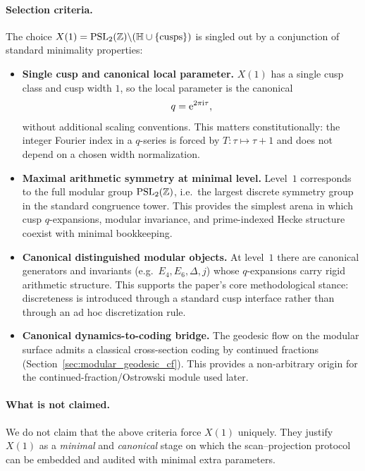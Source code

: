 \paragraph{Selection criteria.}
The choice $X(1)=\mathrm{PSL}_2(\mathbb{Z})\backslash(\mathbb{H}\cup\{\text{cusps}\})$ is singled out by a conjunction of standard minimality properties:
\begin{itemize}
  \item \textbf{Single cusp and canonical local parameter.}
  $X(1)$ has a single cusp class and cusp width $1$, so the local parameter is the canonical
  \begin{equation}
  q=\mathrm{e}^{2\pi\mathrm{i}\tau},
  \end{equation}
  without additional scaling conventions. This matters constitutionally: the integer Fourier index in a $q$-series is forced by $T:\tau\mapsto\tau+1$ and does not depend on a chosen width normalization.

  \item \textbf{Maximal arithmetic symmetry at minimal level.}
  Level~$1$ corresponds to the full modular group $\mathrm{PSL}_2(\mathbb{Z})$, i.e.\ the largest discrete symmetry group in the standard congruence tower. This provides the simplest arena in which cusp $q$-expansions, modular invariance, and prime-indexed Hecke structure coexist with minimal bookkeeping.

  \item \textbf{Canonical distinguished modular objects.}
  At level~$1$ there are canonical generators and invariants (e.g.\ $E_4,E_6,\Delta,j$) whose $q$-expansions carry rigid arithmetic structure. This supports the paper's core methodological stance: discreteness is introduced through a standard cusp interface rather than through an ad hoc discretization rule.

  \item \textbf{Canonical dynamics-to-coding bridge.}
  The geodesic flow on the modular surface admits a classical cross-section coding by continued fractions (Section~\ref{sec:modular_geodesic_cf}). This provides a non-arbitrary origin for the continued-fraction/Ostrowski module used later.
\end{itemize}

\paragraph{What is not claimed.}
We do not claim that the above criteria force $X(1)$ uniquely. They justify $X(1)$ as a \emph{minimal} and \emph{canonical} stage on which the scan--projection protocol can be embedded and audited with minimal extra parameters.


